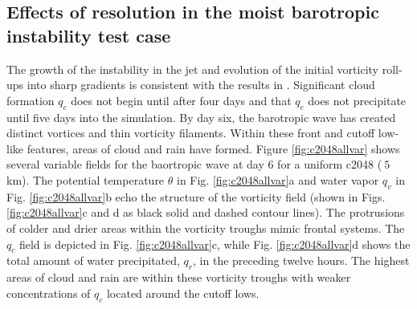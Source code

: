 \subsection{Effects of resolution in the moist barotropic instability test case}
The growth of the instability in the jet and evolution of the initial vorticity
roll-ups into sharp gradients is consistent with the results in \cite{galewsky2004initial}.
Significant cloud formation $q_c$ does not begin until after four days and that $q_c$ 
does not precipitate until five days into the simulation. By day six, the barotropic
wave has created distinct vortices and thin vorticity filaments. Within these front and
cutoff low-like features, areas of cloud and rain have formed. Figure \ref{fig:c2048allvar}
shows several variable fields for the baortropic wave at day 6 for
a uniform c2048 ($~5$ km). The potential
temperature $\theta$ in Fig. \ref{fig:c2048allvar}a and water vapor $q_v$ in
Fig. \ref{fig:c2048allvar}b echo the structure of the vorticity field 
(shown in Figs. \ref{fig:c2048allvar}c and d as black solid and dashed contour lines).
The protrusions of colder and drier areas within the vorticity troughs mimic frontal
systems. The $q_c$ field is depicted in Fig. \ref{fig:c2048allvar}c, while
Fig. \ref{fig:c2048allvar}d shows the total amount of water precipitated, $q_r$, 
in the preceding twelve hours. The highest areas of cloud and rain are 
within these vorticity troughs with weaker concentrations of $q_c$ located around
the cutoff lows.

